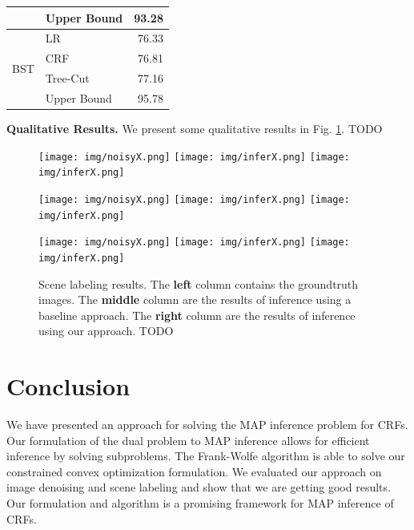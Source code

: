 \documentclass[conference]{IEEEtran}
\begin{document}
\begin{table}[ht]
\begin{minipage}[b]{0.35\linewidth}
{\begin{tabular}{|l|l|r|}
					 & Upper Bound						& 93.28 \\%
\hline
\multirow{4}{*}{BST} & LR								& 76.33 \\%
 & CRF													& 76.81 \\
 & Tree-Cut												& 77.16 \\%
 & Upper Bound											& 95.78 \\%
\hline
\hline
\end{tabular}
}
\end{minipage}
\end{table}

{\bf Qualitative Results.} We present some qualitative results in Fig. \ref{fig:scenelabelingresults}. TODO

\begin{figure}
\centering
\begin{minipage}{1\columnwidth}
	\texttt{[image: img/noisyX.png]}\hfill%
	\texttt{[image: img/inferX.png]}\hfill%
	\texttt{[image: img/inferX.png]}
\end{minipage}
\begin{minipage}{1\columnwidth}
	\texttt{[image: img/noisyX.png]}\hfill%
	\texttt{[image: img/inferX.png]}\hfill%
	\texttt{[image: img/inferX.png]}
\end{minipage}
\begin{minipage}{1\columnwidth}
	\texttt{[image: img/noisyX.png]}\hfill%
	\texttt{[image: img/inferX.png]}\hfill%
	\texttt{[image: img/inferX.png]}
\end{minipage}
\caption{Scene labeling results. The {\bf left} column contains the groundtruth images. The {\bf middle} column are the results of inference using a baseline approach. The {\bf right} column are the results of inference using our approach. TODO}
\label{fig:scenelabelingresults}
\end{figure}

\section{Conclusion}

We have presented an approach for solving the MAP inference problem for CRFs. Our formulation of the dual problem to MAP inference allows for efficient inference by solving subproblems. The Frank-Wolfe algorithm is able to solve our constrained convex optimization formulation. We evaluated our approach on image denoising and scene labeling and show that we are getting good results. Our formulation and algorithm is a promising framework for MAP inference of CRFs.
\end{document}
